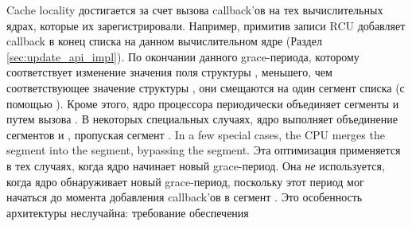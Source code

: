 Cache locality достигается за счет вызова callback'ов на тех вычислительных ядрах,
которые их зарегистрировали.
Например, примитив записи RCU  добавляет
callback  в конец списка 
на данном вычислительном ядре (Раздел \ref{sec:update_api_impl}).
По окончании данного grace-периода, которому соответствует изменение значения
поля  структуры , меньшего, чем соответствующее значение
структуры , они смещаются на один сегмент списка
(с помощью ).
Кроме этого, ядро процессора периодически объединяет сегменты 
и  путем вызова .
В некоторых специальных случаях, ядро выполняет объединение сегментов
 и , пропуская сегмент .
In a few special cases, the CPU merges the  segment
into the  segment, bypassing the 
segment.
Эта оптимизация применяется в тех случаях, когда ядро начинает новый grace-период.
Она \emph{не} используется, когда ядро обнаруживает новый grace-период,
поскольку этот период мог начаться до момента добавления callback'ов
в сегмент .
%
Это особенность архитектуры неслучайна: требование обеспечения
